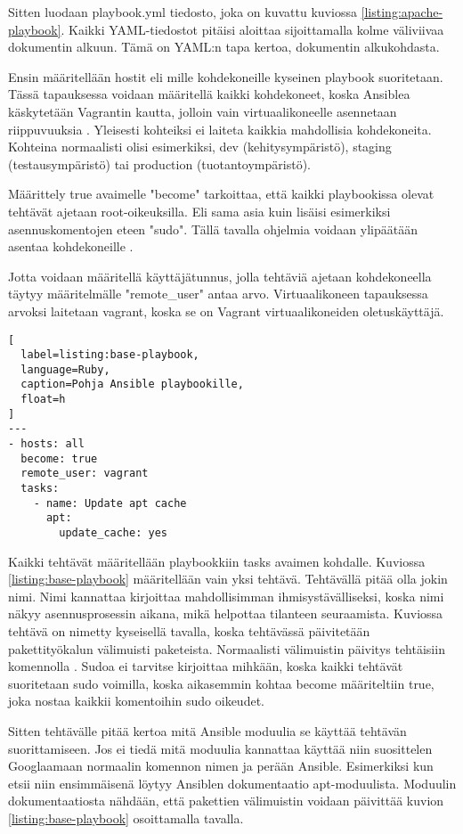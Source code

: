Sitten luodaan playbook.yml tiedosto, joka on kuvattu kuviossa \ref{listing:apache-playbook}. Kaikki YAML-tiedostot pitäisi aloittaa sijoittamalla kolme väliviivaa dokumentin alkuun. Tämä on YAML:n tapa kertoa, dokumentin alkukohdasta.

Ensin määritellään hostit eli mille kohdekoneille kyseinen playbook suoritetaan. Tässä tapauksessa voidaan määritellä kaikki kohdekoneet, koska Ansiblea käskytetään Vagrantin kautta, jolloin vain virtuaalikoneelle asennetaan riippuvuuksia \cite{link:comprehensive-ansible-tutorial}. Yleisesti kohteiksi ei laiteta kaikkia mahdollisia kohdekoneita. Kohteina normaalisti olisi esimerkiksi, dev (kehitysympäristö), staging (testausympäristö) tai production (tuotantoympäristö).

Määrittely true avaimelle "become" tarkoittaa, että kaikki playbookissa olevat tehtävät ajetaan root-oikeuksilla. Eli sama asia kuin lisäisi esimerkiksi asennuskomentojen eteen "sudo". Tällä tavalla ohjelmia voidaan ylipäätään asentaa kohdekoneille \cite{link:ansible-configuration-file}.

Jotta voidaan määritellä käyttäjätunnus, jolla tehtäviä ajetaan kohdekoneella täytyy määritelmälle "remote\_user" antaa arvo. Virtuaalikoneen tapauksessa arvoksi laitetaan vagrant, koska se on Vagrant virtuaalikoneiden oletuskäyttäjä.

\begin{lstlisting}[
  label=listing:base-playbook,
  language=Ruby,
  caption=Pohja Ansible playbookille,
  float=h
]
---
- hosts: all
  become: true
  remote_user: vagrant
  tasks:
    - name: Update apt cache
      apt:
        update_cache: yes
\end{lstlisting}

Kaikki tehtävät määritellään playbookkiin tasks avaimen kohdalle. Kuviossa \ref{listing:base-playbook} määritellään vain yksi tehtävä. Tehtävällä pitää olla jokin nimi. Nimi kannattaa kirjoittaa mahdollisimman ihmisystävälliseksi, koska nimi näkyy asennusprosessin aikana, mikä helpottaa tilanteen seuraamista. Kuviossa tehtävä on nimetty kyseisellä tavalla, koska tehtävässä päivitetään pakettityökalun välimuisti paketeista. Normaalisti välimuistin päivitys tehtäisiin komennolla . Sudoa ei tarvitse kirjoittaa mihkään, koska kaikki tehtävät suoritetaan sudo voimilla, koska aikasemmin kohtaa become määriteltiin true, joka nostaa kaikkii komentoihin sudo oikeudet.

Sitten tehtävälle pitää kertoa mitä Ansible moduulia se käyttää tehtävän suorittamiseen. Jos ei tiedä mitä moduulia kannattaa käyttää niin suosittelen Googlaamaan normaalin komennon nimen ja perään Ansible. Esimerkiksi kun etsii  niin ensimmäisenä löytyy Ansiblen dokumentaatio apt-moduulista. Moduulin dokumentaatiosta nähdään, että pakettien välimuistin voidaan päivittää kuvion \ref{listing:base-playbook} osoittamalla tavalla.

